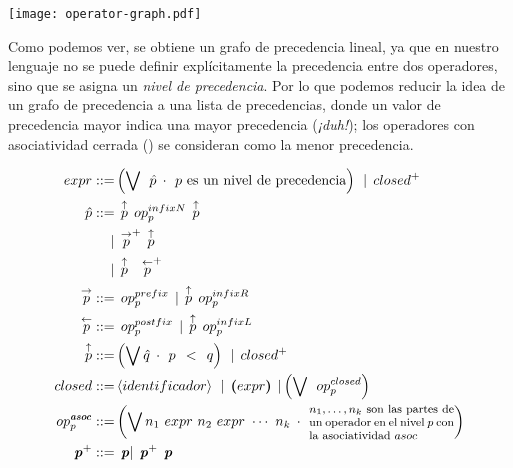 {\begin{investigationfr}
\begin{center}
\texttt{[image: operator-graph.pdf]}
\label{fig:operator-graph}
\end{center}

Como podemos ver, se obtiene un grafo de precedencia lineal, ya que en nuestro lenguaje no se puede definir explícitamente la precedencia entre dos operadores, sino que se asigna un \emph{nivel de precedencia}. Por lo que podemos reducir la idea de un grafo de precedencia a una lista de precedencias, donde un valor de precedencia mayor indica una mayor precedencia (\emph{¡duh!}); los operadores con asociatividad cerrada () se consideran como la menor precedencia.

{   %
\newcommand{\overp}[1]{\overset{#1}{p}}
\renewcommand{\emph}[1]{\textbf{\textit{#1}}}
\renewcommand{\_}{\:\:}

\begin{align*}
expr ::=
    & \left( \bigvee \_ \hat{p} \_ \cdotp \_
        \text{$p$ es un nivel de precedencia} \right) \_
    | \_ closed^{+}
\\
\hat{p} ::=
     & \_ \overp{\uparrow} \_ op_p^{infixN} \_ \overp{\uparrow} \\
    |& \_ \overp{\rightarrow}^{+} \_ \overp{\uparrow} \\
    |& \_ \overp{\uparrow}\quad \overp{\leftarrow}^{+}
\\
\overp{\rightarrow} ::=
    & \_ op_p^{prefix} \_
    | \_ \overp{\uparrow} \_ op_p^{infixR}
\\
\overp{\leftarrow} ::=
    & \_ op_p^{postfix} \_
    | \_ \overp{\uparrow} \_ op_p^{infixL}
\\
\overp{\uparrow} ::=
    & \left( \bigvee \hat{q} \_ \cdotp \_ p \_ < \_ q \right) \_
    | \_ closed^{+}
\\
closed ::=
    & \left<identificador\right> \_
    | \_ \boldsymbol{(} expr \boldsymbol{)} \_
    | \left( \bigvee \_ op_p^{closed} \right)
\\
op_p^{\emph{asoc}} ::=
    & \left( \bigvee n_1\ expr\ n_2\ expr\ \cdots\ n_k \_ \cdotp \_
        \parbox{0.3\textwidth}{\footnotesize$n_1,\ldots,n_k$ son las partes de un operador en el nivel $p$ con la asociatividad $asoc$} \right)
\\
\emph{p}^{+} ::=
    & \_ \emph{p}
    | \_ \emph{p}^{+} \_ \emph{p} \_
\end{align*}
\label{fig:mixfix-grammar}
}
\end{investigationfr}

}
